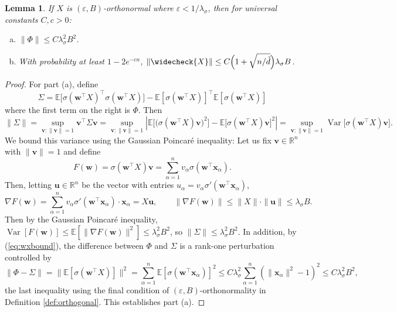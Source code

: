 \documentclass{article}
\newtheorem{lemma}[theorem]{Lemma}
\theoremstyle{definition}
\newcommand{\R}{\mathbb{R}}
\newcommand{\E}{\mathbb{E}}
\newcommand{\x}{\mathbf{x}}
\renewcommand{\u}{\mathbf{u}}
\renewcommand{\v}{\mathbf{v}}
\newcommand{\w}{\mathbf{w}}
\renewcommand{\a}{\alpha}
\newcommand{\eps}{\varepsilon}
\newcommand{\vd}{\check{d}}
\newcommand{\vX}{\widecheck{X}}
\newcommand{\1}{\mathbf{1}}
\newcommand{\Var}{\operatorname{Var}}
\begin{document}
\begin{lemma}\label{lemma:normbound}
If $X$ is $(\eps,B)$-orthonormal where $\eps<1/\lambda_\sigma$,
then for universal constants $C,c>0$:
\begin{enumerate}[(a)]
\item $\|\Phi\| \leq C\lambda_\sigma^2 B^2$.
\item With probability at least $1-2e^{-cn}$,
$\|\vX\| \leq C\Big(1+\sqrt{n/\vd}\Big)\lambda_\sigma B$.
\end{enumerate}
\end{lemma}
\begin{proof}
For part (a), define
\begin{equation}\label{eq:Sigma}
\Sigma=\E\Big[\sigma(\w^\top X)^\top \sigma(\w^\top X)\Big]
-\E[\sigma(\w^\top X)]^\top\E[\sigma(\w^\top X)]
\end{equation}
where the first term on the right is $\Phi$. Then
\[\|\Sigma\|=\sup_{\v:\|\v\|=1} \v^\top \Sigma \v
=\sup_{\v:\|\v\|=1} \left|\E\Big[\big(\sigma(\w^\top X)
\v\big)^2\Big]-\E\Big[\sigma(\w^\top X)\v\Big]^2\right|
=\sup_{\v:\|\v\|=1} \Var\big[\sigma(\w^\top X)\v\big].\]
We bound this variance using the Gaussian Poincar\'e inequality:
Let us fix $\v\in\R^n$ with $\|\v\|=1$ and define
\[F(\w)=\sigma(\w^\top X)\v=\sum_{\a=1}^n v_\a \sigma(\w^\top \x_\a).\]
Then, letting $\u \in \R^n$ be the vector with entries
$u_\a=v_\a \sigma'(\w^\top \x_\a)$,
\begin{equation}\label{eq:Flipschitz}
\nabla F(\w)=\sum_{\a=1}^n v_\a \sigma'(\w^\top \x_\a) \cdot \x_\a
=X\u, \qquad \|\nabla F(\w)\| \leq \|X\| \cdot \|\u\|
\leq \lambda_\sigma B.
\end{equation}
Then by the Gaussian Poincar\'e inequality,
$\Var[F(\w)] \leq \E[\|\nabla F(\w)\|^2] \leq \lambda_\sigma^2B^2$,
so $\|\Sigma\| \leq \lambda_\sigma^2 B^2$.
In addition, by (\ref{eq:wxbound}), the difference between $\Phi$ and $\Sigma$ is a rank-one perturbation controlled by
\begin{equation}\label{eq:rankone_perturbation_bound}
\|\Phi-\Sigma\|=\|\E[\sigma(\w^\top X)]\|^2=\sum_{\a=1}^n
\E[\sigma(\w^\top \x_\a)]^2 \leq C\lambda_\sigma^2
\sum_{\a=1}^n (\|\x_\a\|^2-1)^2 \leq C \lambda_\sigma^2B^2,
\end{equation}
the last inequality using the final condition of $(\eps,B)$-orthonormality in
Definition \ref{def:orthogonal}. This establishes part (a).


\end{proof}
\end{document}
